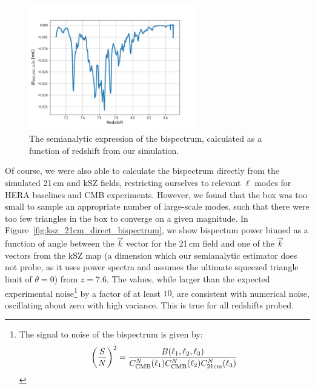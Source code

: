 \begin{figure}
\centering
\includegraphics[width=0.65\textwidth]{chapters/ksz_21cm/figures/semianalytic_bispec_vs_z.png}
\caption{The semianalytic expression of the bispectrum, calculated as a function of redshift from our simulation.}
\label{fig:ksz_21cm_semianalytic_result}
\end{figure}

Of course, we were also able to calculate the bispectrum directly from the simulated 21\,cm and kSZ fields, restricting ourselves to relevant $\ell$ modes for HERA baselines and CMB experiments. However, we found that the box was too small to sample an appropriate number of large-scale modes, such that there were too few triangles in the box to converge on a given magnitude. In Figure~\ref{fig:ksz_21cm_direct_bispectrum}, we show bispectum power binned as a function of angle between the $\vec{k}$ vector for the 21\,cm field and one of the $\vec{k}$ vectors from the kSZ map (a dimension which our semianalytic estimator does not probe, as it uses power spectra and assumes the ultimate squeezed triangle limit of $\theta = 0$) from $z=7.6$. The values, while larger than the expected experimental noise\footnote{The signal to noise of the bispectrum is given by: \begin{equation}
\left(\frac{S}{N}\right)^2 = \frac{B(\ell_1, \ell_2, \ell_3)}{C_{\rm CMB}^N(\ell_1)C_{\rm CMB}^N(\ell_2)C_{\rm 21cm}^N(\ell_3)}
\end{equation}} by a factor of at least $10$, are consistent with numerical noise, oscillating about zero with high variance. This is true for all redshifts probed.


